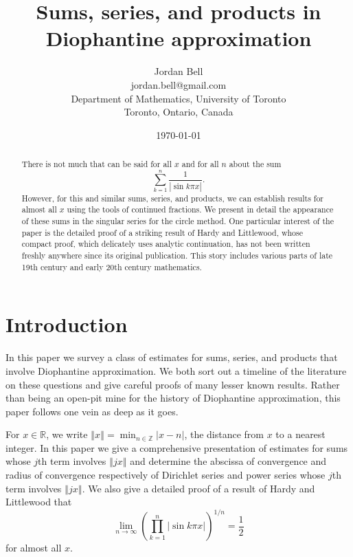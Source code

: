 \documentclass{article}
\newcommand{\norm}[1]{\left\Vert #1 \right\Vert}
\begin{document}
\title{Sums, series, and products in Diophantine approximation}
\author{Jordan Bell \\
jordan.bell@gmail.com \\
Department of Mathematics, University of Toronto\\
Toronto, Ontario, Canada}
\date{\today}




\maketitle

\begin{abstract}
There is not much that can be said for all $x$ and for all $n$ about the sum \[ \sum_{k=1}^n \frac{1}{|\sin k\pi x|}. \] However, for this and similar sums, series, and products, we can establish results for almost all $x$ using the tools of continued fractions. We present in detail the appearance of these sums in the singular series for the circle method. One particular interest of the paper is the detailed proof of a striking result of Hardy and Littlewood, whose compact proof, which delicately uses analytic continuation, has not been written freshly anywhere since its original publication. This story includes various parts of late 19th century and early 20th century mathematics.
\end{abstract}

\tableofcontents


\section{Introduction}
In this paper we survey a class of estimates for sums, series, and products that involve Diophantine approximation.
We both sort out a timeline of the literature on these questions and give careful proofs of many lesser known results.
Rather than being an open-pit mine for the history of Diophantine approximation, this paper follows one vein as deep as it goes.

 
For $x \in \mathbb{R}$, we write $\norm{x}=\min_{n \in \mathbb{Z}} |x-n|$, the distance from $x$ to a nearest integer. 
In this paper we give a comprehensive presentation of estimates for sums whose $j$th term involves $\norm{jx}$ and
determine the abscissa of convergence and radius of convergence respectively of Dirichlet series and power series whose
$j$th term involves $\norm{jx}$. We also give a detailed proof of a result of Hardy and Littlewood that 
\[
\lim_{n \to \infty} \left( \prod_{k=1}^n |\sin k\pi x| \right)^{1/n} = \frac{1}{2}
\]
for almost all $x$. 
\end{document}
